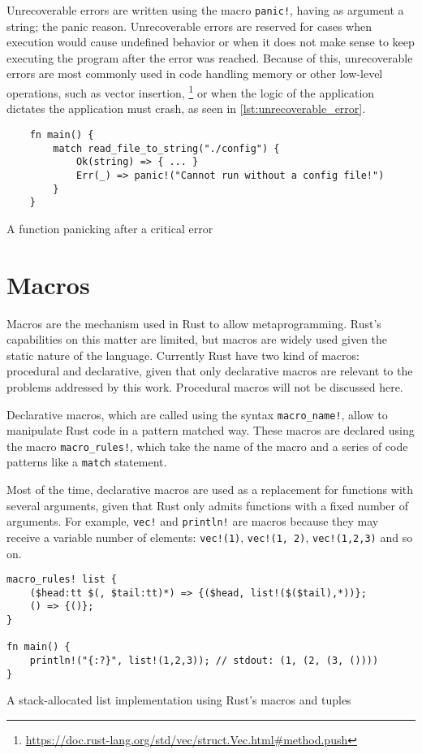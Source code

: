 Unrecoverable errors are written using the macro \texttt{panic!}, having as argument a string; the panic reason. Unrecoverable errors are reserved for cases when execution would cause undefined behavior or when it does not make sense to keep executing the program after the error was reached. Because of this, unrecoverable errors are most commonly used in code handling memory or other low-level operations, such as vector insertion, \footnote{\url{https://doc.rust-lang.org/std/vec/struct.Vec.html\#method.push}} or when the logic of the application dictates the application must crash, as seen in \ref{lst:unrecoverable_error}.


\begin{listing}[ht]
	\begin{verbatim}
    fn main() {
        match read_file_to_string("./config") {
            Ok(string) => { ... }
            Err(_) => panic!("Cannot run without a config file!")
        }
    }
    \end{verbatim}
  \caption{A function panicking after a critical error}
  \label{lst:unrecoverable_error}
\end{listing}

\section{Macros}
Macros are the mechanism used in Rust to allow metaprogramming. Rust's capabilities on this matter are limited, but macros are widely used given the static nature of the language. Currently Rust have two kind of macros: procedural and declarative, given that only declarative macros are relevant to the problems addressed by this work. Procedural macros will not be discussed here.

Declarative macros, which are called using the syntax \texttt{macro\_name!}, allow to manipulate Rust code in a pattern matched way. These macros are declared using the macro \texttt{macro\_rules!}, which take the name of the macro and a series of code patterns like a \texttt{match} statement. 

Most of the time, declarative macros are used as a replacement for functions with several arguments, given that Rust only admits functions with a fixed number of arguments. For example, \texttt{vec!} and \texttt{println!} are macros because they may receive a variable number of elements: \texttt{vec!(1)},  \texttt{vec!(1, 2)},  \texttt{vec!(1,2,3)} and so on.


\begin{listing}[ht]
	\begin{verbatim}
macro_rules! list {
    ($head:tt $(, $tail:tt)*) => {($head, list!($($tail),*))};
    () => {()};
}

fn main() {
    println!("{:?}", list!(1,2,3)); // stdout: (1, (2, (3, ())))
}
    \end{verbatim}
  \caption{A stack-allocated list implementation using Rust's macros and tuples}
  \label{lst:unrecoverable_error}
\end{listing}

